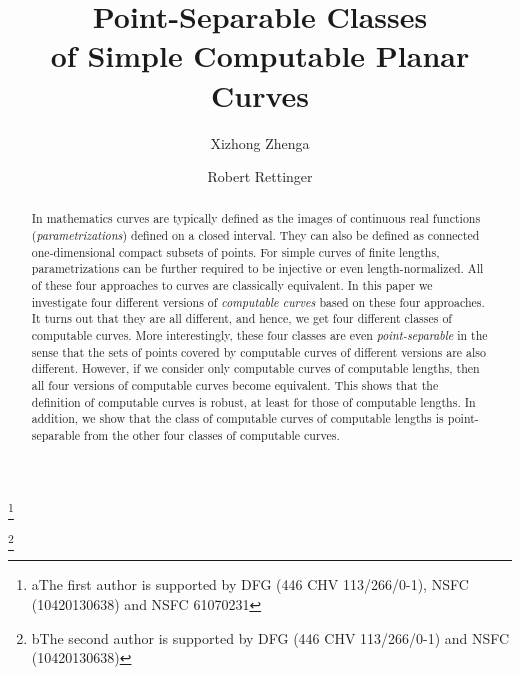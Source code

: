 \documentclass{LMCS}
\theoremstyle{plain}
\begin{document}
\title[Point-Separable Classes of Computable Curves]{Point-Separable Classes\\ of Simple Computable Planar Curves}

\author[X.~Zheng]{Xizhong Zheng\rsuper a}	
\address{{\lsuper a}Jiangsu University, Zhenjiang 212013, China, and
Arcadia University, Glenside, PA 19038, USA}	
\thanks{{\lsuper a}The first author is supported by DFG  (446 CHV 113/266/0-1),  NSFC (10420130638) and NSFC 61070231}	

\author[R.~Rettinger]{Robert Rettinger}
\address{FernUniversit\"at Hagen, 58084 Hagen, Germany\rsuper b}	
\thanks{{\lsuper b}The second author is supported by DFG  (446 CHV 113/266/0-1) and NSFC (10420130638)}





\begin{abstract}
\noindent
In mathematics curves are typically defined as the images of continuous real functions ({\em parametrizations}) defined on a closed interval. They can also be defined as connected one-dimensional compact subsets of points. For simple curves of finite lengths, parametrizations can be further required to be injective or even length-normalized. All of these four approaches to curves are classically equivalent. In this paper we investigate four different versions of {\em computable curves} based on these four approaches. It turns out that they are all different, and hence, we get four different classes of computable curves. More interestingly, these four classes are even {\em point-separable} in the sense that the sets of points covered by computable curves of different versions are also different. However, if we consider only computable curves of computable lengths, then all four versions of computable curves become equivalent. This shows that the definition of computable curves is robust, at least for those of computable lengths. In addition, we  show that the class of computable curves of computable lengths is point-separable from the other four classes of computable curves.
\end{abstract}

\maketitle
\end{document}
